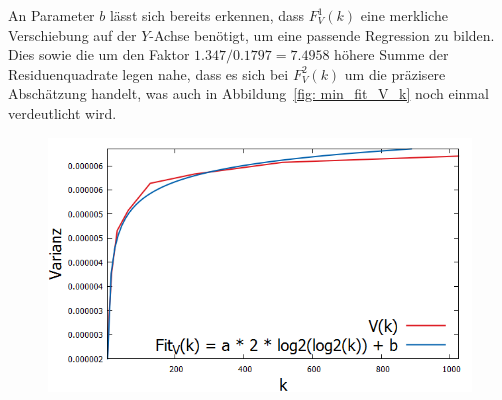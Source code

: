 \noindent
An Parameter $b$ lässt sich bereits erkennen, dass $F_V^1(k)$ eine merkliche Verschiebung auf der $Y$-Achse benötigt, um eine passende Regression zu bilden. Dies sowie die um den Faktor $1.347/0.1797 =7.4958$ höhere Summe der Residuenquadrate legen nahe, dass es sich bei $F_V^2(k)$ um die präzisere Abschätzung handelt, was auch in Abbildung~\ref{fig: min_fit_V_k} noch einmal verdeutlicht wird.

\begin{figure}[H]
	\hspace*{-1cm}
    \begin{minipage}[t]{.30\textwidth}
        \centering
        \includegraphics[width=1.2\textwidth]{pictures/min_filter_fit_V_k.png}
    \end{minipage}
    \hspace*{.8cm}
    \begin{minipage}[t]{.30\textwidth}
        \centering

\end{minipage}
\end{figure}
